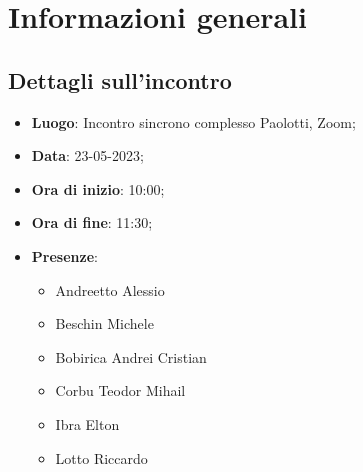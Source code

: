 \section{Informazioni generali}

\subsection{Dettagli sull'incontro}
\begin{itemize}
\item \textbf{Luogo}: Incontro sincrono complesso Paolotti, Zoom;
\item \textbf{Data}: 23-05-2023;
\item \textbf{Ora di inizio}: 10:00;
\item \textbf{Ora di fine}: 11:30;
\item \textbf{Presenze}: 
\begin{itemize}
	\item Andreetto Alessio
    \item Beschin Michele
    \item Bobirica Andrei Cristian
    \item Corbu Teodor Mihail
    \item Ibra Elton
    \item Lotto Riccardo
\end{itemize}
\end{itemize}



